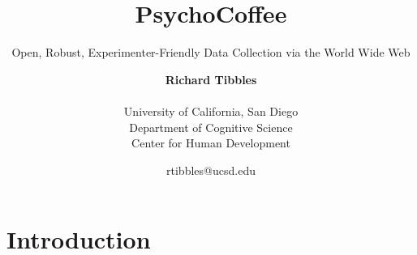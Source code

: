 \documentclass[12pt,a4paper,titlepage]{scrreprt}
\begin{document}
    \title{PsychoCoffee}
    \subtitle{Open, Robust, Experimenter-Friendly Data Collection via the World Wide Web}
    \date{\small{{rtibbles}@ucsd.edu}}
    \author{{\bf Richard Tibbles} \\ \\
                \small{University of California, San Diego} \\
                \small{Department of Cognitive Science} \\
                \small{Center for Human Development}}
    \maketitle
\newpage

\tableofcontents

\newpage

\chapter{Introduction}
    
\end{document}
